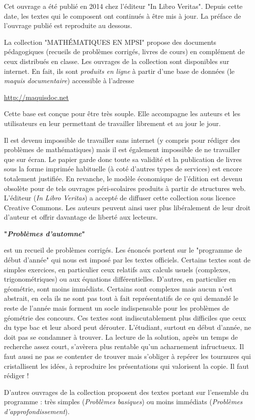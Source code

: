 Cet ouvrage a été publié en 2014 chez l'éditeur "In Libro Veritas". Depuis cette date, les textes qui le composent ont continués à être mis à jour. La préface de l'ouvrage publié est reproduite au dessous.



La collection "MATH\'EMATIQUES EN MPSI" propose des documents pédagogiques (recueils de problèmes corrigés, livres de cours) en complément de ceux distribués en classe.\newline
Les ouvrages de la collection sont  disponibles sur internet. En fait, ils sont \emph{produits en ligne} à partir d'une base de données (le \emph{maquis documentaire}) accessible à l'adresse
\begin{center}
 \href{http://maquisdoc.net}{http://maquisdoc.net}
\end{center}
Cette base est conçue pour être très souple. Elle accompagne les auteurs et les utilisateurs en leur permettant de travailler librement et au jour le jour.

Il est devenu impossible de travailler sans internet (y compris pour rédiger des problèmes de mathématiques) mais il est également impossible de ne travailler que sur écran. Le papier garde donc toute sa validité et la publication de livres sous la forme imprimée habituelle (à coté d'autres types de services) est encore totalement justifiée.\newline
En revanche, le modèle économique de l'édition est devenu obsolète pour de tels ouvrages péri-scolaires produits à partir de structures web. L'éditeur (\emph{In Libro Veritas}) a accepté de diffuser cette collection sous licence Creative Commons. Les auteurs peuvent ainsi user plus libéralement de leur droit d'auteur et offrir davantage de liberté aux lecteurs.

\begin{center}
 \textbf{"\emph{Problèmes d'automne}"}
\end{center}
est un recueil de problèmes corrigés.\newline
Les énoncés portent sur le "programme de début d'année" qui nous est imposé par les textes officiels. Certains textes sont de simples exercices, en particulier ceux relatifs aux calculs usuels (complexes, trigonométriques) ou aux équations différentielles. D'autres, en particulier en géométrie, sont moins immédiats. Certains sont complexes mais aucun n'est abstrait, en cela ils ne sont pas tout à fait représentatifs de ce qui demandé le reste de l'année mais forment un socle indispensable pour les problèmes de géométrie des concours.\newline
Ces textes sont indiscutablement plus difficiles que ceux du type bac et leur abord peut dérouter. L'étudiant, surtout en début d'année, ne doit pas se condamner à trouver. La lecture de la solution, après un temps de recherche assez court, s'avèrera plus rentable qu'un acharnement infructueux. Il faut aussi ne pas se contenter de trouver mais s'obliger à repérer les tournures qui cristallisent les idées, à reproduire les présentations qui valorisent la copie. Il faut rédiger !


D'autres ouvrages de la collection proposent des textes portant sur l'ensemble du programme : très simples (\emph{Problèmes basiques}) ou moins immédiats (\emph{Problèmes d'approfondissement}).
 
